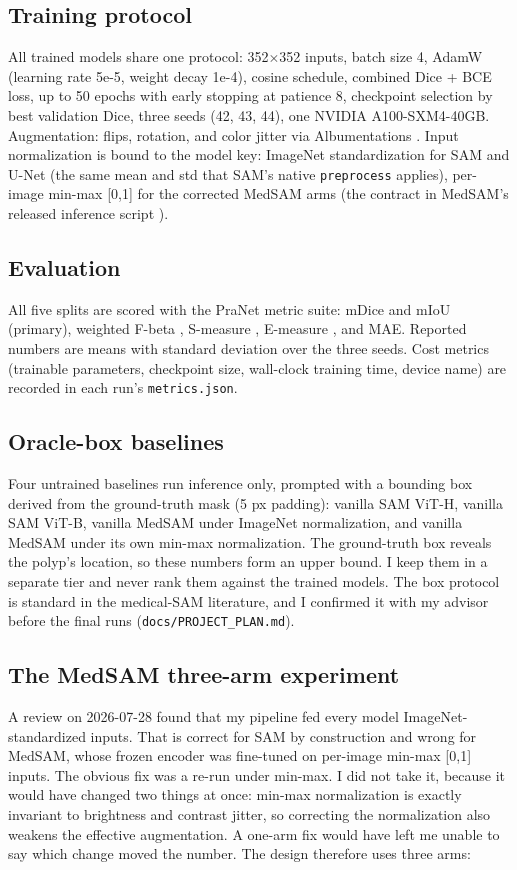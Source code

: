 \documentclass[conference]{IEEEtran}
\begin{document}
\subsection{Training protocol}\label{sec:4.3}
All trained models share one protocol: 352$\times$352 inputs, batch size 4, AdamW \cite{ref18} (learning rate 5e-5, weight decay 1e-4), cosine schedule, combined Dice + BCE loss, up to 50 epochs with early stopping at patience 8, checkpoint selection by best validation Dice, three seeds (42, 43, 44), one NVIDIA A100-SXM4-40GB. Augmentation: flips, rotation, and color jitter via Albumentations \cite{ref20}. Input normalization is bound to the model key: ImageNet standardization for SAM and U-Net (the same mean and std that SAM's native \texttt{preprocess} applies), per-image min-max [0,1] for the corrected MedSAM arms (the contract in MedSAM's released inference script \cite{ref16}).


\subsection{Evaluation}\label{sec:4.4}
All five splits are scored with the PraNet metric suite: mDice and mIoU (primary), weighted F-beta \cite{ref17}, S-measure \cite{ref13}, E-measure \cite{ref14}, and MAE. Reported numbers are means with standard deviation over the three seeds. Cost metrics (trainable parameters, checkpoint size, wall-clock training time, device name) are recorded in each run's \texttt{metrics.json}.


\subsection{Oracle-box baselines}\label{sec:4.5}
Four untrained baselines run inference only, prompted with a bounding box derived from the ground-truth mask (5 px padding): vanilla SAM ViT-H, vanilla SAM ViT-B, vanilla MedSAM under ImageNet normalization, and vanilla MedSAM under its own min-max normalization. The ground-truth box reveals the polyp's location, so these numbers form an upper bound. I keep them in a separate tier and never rank them against the trained models. The box protocol is standard in the medical-SAM literature, and I confirmed it with my advisor before the final runs (\texttt{docs/PROJECT\_PLAN.md}).


\subsection{The MedSAM three-arm experiment}\label{sec:4.6}
A review on 2026-07-28 found that my pipeline fed every model ImageNet-standardized inputs. That is correct for SAM by construction and wrong for MedSAM, whose frozen encoder was fine-tuned on per-image min-max [0,1] inputs. The obvious fix was a re-run under min-max. I did not take it, because it would have changed two things at once: min-max normalization is exactly invariant to brightness and contrast jitter, so correcting the normalization also weakens the effective augmentation. A one-arm fix would have left me unable to say which change moved the number. The design therefore uses three arms:
\end{document}
